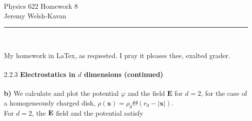 \documentclass[]{book}
\begin{document}
\begin{center}
{\Large Physics 622 Homework 8}\\
{Jeremy Welsh-Kavan}\\
\end{center}
\vspace{0.2 cm}
\begin{center}
\noindent\rule{15cm}{0.4pt} \\
\end{center}
My homework in LaTex, as requested. I pray it pleases thee, exalted grader. \\
\vspace{0.1 cm} \\
{2.2.3 \hspace{0.5cm} \textbf{Electrostatics in $d$ dimensions (continued)}} \\
\vspace{0.1 cm} \\
\textbf{b)} We calculate and plot the potential $\varphi$ and the field $\textbf{E}$ for $d=2$, for the case of a homogeneously charged disk, $\rho(\textbf{x}) = \rho_0 \Theta(r_0-|\textbf{x}|)$. \\
For $d=2$, the $\textbf E$ field and the potential satisfy
\end{document}
